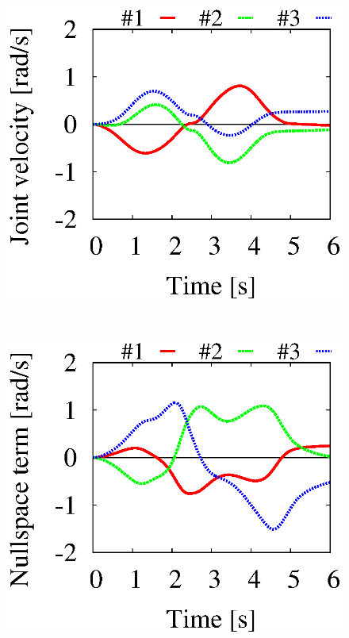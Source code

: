\begin{figure}[t]
\begin{minipage}{0.327\linewidth}
  \end{minipage}
  \begin{minipage}{0.327\linewidth}
    \centering
    \includegraphics[width=1.0\linewidth]{fig/chapter7/mass/planar/1000.eps}
  \end{minipage}\\
  \vspace{1em}
  \begin{minipage}{0.327\linewidth}
    \centering
    \includegraphics[width=1.0\linewidth]{fig/chapter7/mass/planar/10_null.eps}

\end{minipage}
\end{figure}
